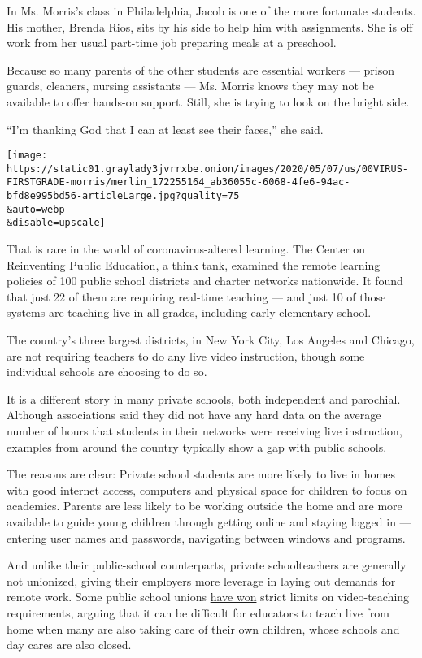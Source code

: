 In Ms. Morris's class in Philadelphia, Jacob is one of the more
fortunate students. His mother, Brenda Rios, sits by his side to help
him with assignments. She is off work from her usual part-time job
preparing meals at a preschool.

Because so many parents of the other students are essential workers ---
prison guards, cleaners, nursing assistants --- Ms. Morris knows they
may not be available to offer hands-on support. Still, she is trying to
look on the bright side.

``I'm thanking God that I can at least see their faces,'' she said.

\texttt{[image: https://static01.graylady3jvrrxbe.onion/images/2020/05/07/us/00VIRUS-FIRSTGRADE-morris/merlin\_172255164\_ab36055c-6068-4fe6-94ac-bfd8e995bd56-articleLarge.jpg?quality=75\\\&auto=webp\\\&disable=upscale]}

That is rare in the world of coronavirus-altered learning. The Center on
Reinventing Public Education, a think tank, examined the remote learning
policies of 100 public school districts and charter networks nationwide.
It found that just 22 of them are requiring real-time teaching --- and
just 10 of those systems are teaching live in all grades, including
early elementary school.

The country's three largest districts, in New York City, Los Angeles and
Chicago, are not requiring teachers to do any live video instruction,
though some individual schools are choosing to do so.

It is a different story in many private schools, both independent and
parochial. Although associations said they did not have any hard data on
the average number of hours that students in their networks were
receiving live instruction, examples from around the country typically
show a gap with public schools.

The reasons are clear: Private school students are more likely to live
in homes with good internet access, computers and physical space for
children to focus on academics. Parents are less likely to be working
outside the home and are more available to guide young children through
getting online and staying logged in --- entering user names and
passwords, navigating between windows and programs.

And unlike their public-school counterparts, private schoolteachers are
generally not unionized, giving their employers more leverage in laying
out demands for remote work. Some public school unions
\href{https://www.nytimes3xbfgragh.onion/2020/04/21/us/coronavirus-teachers-unions-school-home.html}{have
won} strict limits on video-teaching requirements, arguing that it can
be difficult for educators to teach live from home when many are also
taking care of their own children, whose schools and day cares are also
closed.

